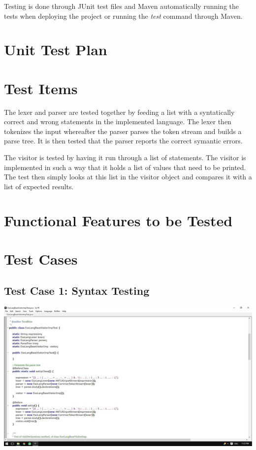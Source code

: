 \documentclass[english]{article}
\begin{document}
			Testing is done through JUnit test files and Maven automatically running the tests when deploying the project or running the \textit{test} command through Maven.
			
			\newpage
					\section*{Unit Test Plan}

		\section{Test Items}
			The lexer and parser are tested together by feeding a list with a syntatically correct and wrong statements in the implemented language. The lexer then tokenizes the input whereafter the parser parses the token stream and builds a parse tree. It is then tested that the parser reports the correct symantic errors.
			
			The visitor is tested by having it run through a list of statements. The visitor is implemented in such a way that it holds a list of values that need to be printed. The test then simply looks at this list in the visitor object and compares it with a list of expected results.
		
	\section{Functional Features to be Tested}
		\vspace{0.8cm}

		\section{Test Cases}
	\vspace{0.4cm}

			\subsection{Test Case 1: Syntax Testing} 
						\includegraphics[width=\linewidth]{test1.jpg}
\end{document}
